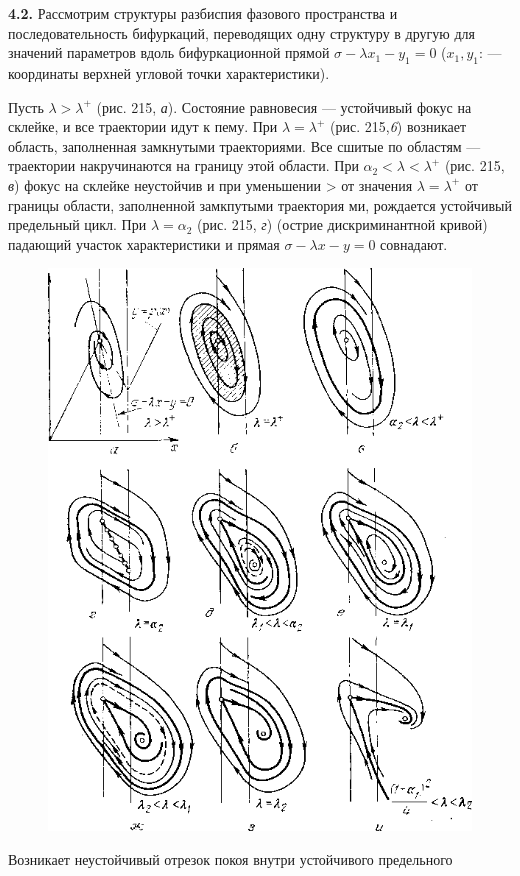 \documentclass{article}
\newcommand{\RomanNumeralCaps}[1]
    {\MakeUppercase{\romannumeral #1}}
\begin{document}
\textbf{4.2.} Рассмотрим структуры разбиспия фазового пространства
и последовательность бифуркаций, переводящих одну структуру в
другую для значений параметров вдоль бифуркационной прямой
$\sigma - \lambda x_{1} - y_{1} = 0$ ($x_{1}, y_{1}$: — координаты верхней угловой точки характеристики).

Пусть $\lambda > \lambda^+$ (рис. 215, \textit{а}). Состояние равновесия — устойчивый 
фокус на склейке, и все траектории идут к пему. При $\lambda =
 \lambda^+$ (рис. 215,\textit{6}) возникает область, заполненная замкнутыми
траекториями. Все сшитые по областям \RomanNumeralCaps{1}—\RomanNumeralCaps{3} траектории накручинаются 
на границу этой области. При $\alpha_{2} < \lambda < \lambda^+$ (рис. 215, \textit{в})
фокус на склейке неустойчив и при уменьшении > от значения
$\lambda = \lambda^+$ от границы области, заполненной замкпутыми траектория
ми, рождается устойчивый предельный цикл. При $\lambda = \alpha_{2}$
(рис. 215, \textit{г}) (острие дискриминантной кривой) падающий участок
характеристики и прямая $\sigma - \lambda x - y = 0$ совнадают. 
\begin{figure}[h]

\centering

\includegraphics[width=0.6\linewidth]{../img/img215.png}

\setcounter{figure}{1}
\renewcommand{\thefigure}{215}

\caption{}

\label{ris:image}

\end{figure}
Возникает неустойчивый отрезок покоя внутри устойчивого предельного
\end{document}
